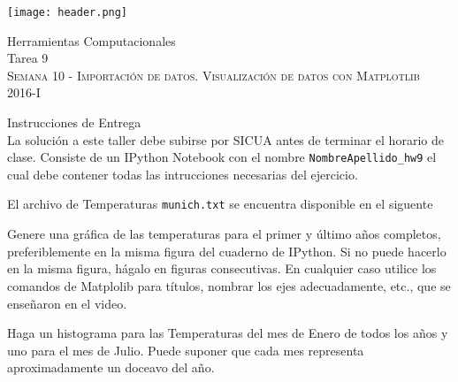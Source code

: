 \documentclass[11pt,letterpaper]{exam}
\begin{document}
\begin{center}

\texttt{[image: header.png]}

\vspace{1.0cm}
{\Large Herramientas Computacionales \\
 Tarea 9} \\
\textsc{Semana 10 - Importaci\'on de datos. Visualizaci\'on de datos con Matplotlib }\\
2016-I\\
\end{center}



\vspace{0.5cm}

{\Large Instrucciones de Entrega}\\

\noindent
La solución a este taller debe subirse por SICUA antes de terminar 
el horario de clase.
\noindent
Consiste de un IPython Notebook con el nombre
\verb"NombreApellido_hw9"
el cual debe contener todas las intrucciones necesarias del ejercicio.


\noindent El archivo de Temperaturas \verb"munich.txt" se encuentra disponible en el siguente 

\begin{questions}


Genere una gr\'afica de las temperaturas para el primer y último años completos, preferiblemente en la misma figura del cuaderno de IPython. Si no puede hacerlo en la misma figura, h\'agalo en figuras consecutivas. En cualquier caso utilice los comandos de Matplolib para t\'itulos, nombrar los ejes adecuadamente, etc., que se ense\~naron en el video.


Haga un histograma para las Temperaturas del mes de Enero de todos los años y uno para el mes de Julio. Puede suponer que cada mes representa aproximadamente un doceavo del a\~no.

\end{questions}
\end{document}
